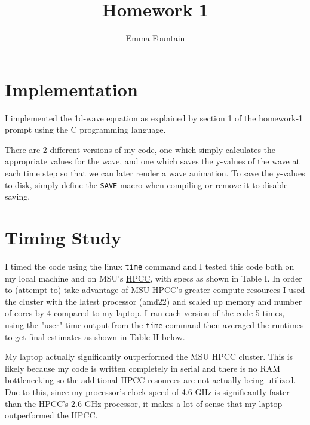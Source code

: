\documentclass[9pt,technote]{IEEEtran}
\begin{document}
\title{Homework 1}
\author{Emma Fountain}

\maketitle

\section{Implementation}

I implemented the 1d-wave equation as explained by section 1 of the homework-1 prompt using the C programming language.

There are 2 different versions of my code, one which simply calculates the appropriate values for the wave, and one which saves the y-values of the wave at each time step so that we can later render a wave animation. To save the y-values to disk, simply define the \texttt{SAVE} macro when compiling or remove it to disable saving.

\section{Timing Study}

I timed the code using the linux \texttt{time} command and I tested this code both on my local machine and on MSU's \href{https://ondemand.hpcc.msu.edu/}{HPCC}, with specs as shown in Table I. In order to (attempt to) take advantage of MSU HPCC's greater compute resources I used the cluster with the latest processor (amd22) and scaled up memory and number of cores by 4 compared to my laptop. I ran each version of the code 5 times, using the "user" time output from the \texttt{time} command then averaged the runtimes to get final estimates as shown in Table II below.

My laptop actually significantly outperformed the MSU HPCC cluster. This is likely because my code is written completely in serial and there is no RAM bottlenecking so the additional HPCC resources are not actually being utilized. Due to this, since my processor's clock speed of 4.6 GHz is significantly faster than the HPCC's 2.6 GHz processor, it makes a lot of sense that my laptop outperformed the HPCC.
\end{document}
